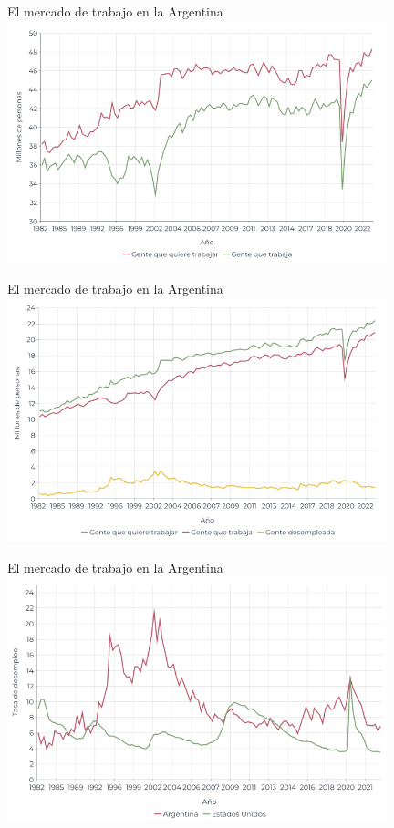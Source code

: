 \documentclass{beamer}
\begin{document}
\begin{frame}{El mercado de trabajo en la Argentina}
\centering\includegraphics[width=11cm]{../Figures/C34.17.png}
\end{frame}

\begin{frame}{El mercado de trabajo en la Argentina}
\centering\includegraphics[width=11cm]{../Figures/C34.18.png}
\end{frame}

\begin{frame}{El mercado de trabajo en la Argentina}
\centering\includegraphics[width=11cm]{../Figures/C34.19.png}
\end{frame}
\end{document}
